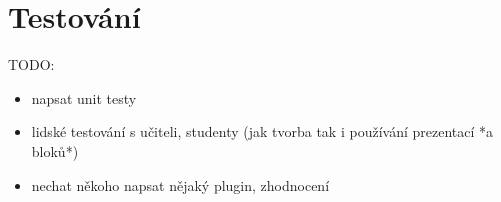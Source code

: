 \chapter{Testování}\label{text:testovani}

TODO:

\begin{itemize}
    \item napsat unit testy
    \item lidské testování s učiteli, studenty (jak tvorba tak i používání prezentací *a bloků*)
    \item nechat někoho napsat nějaký plugin, zhodnocení
\end{itemize}